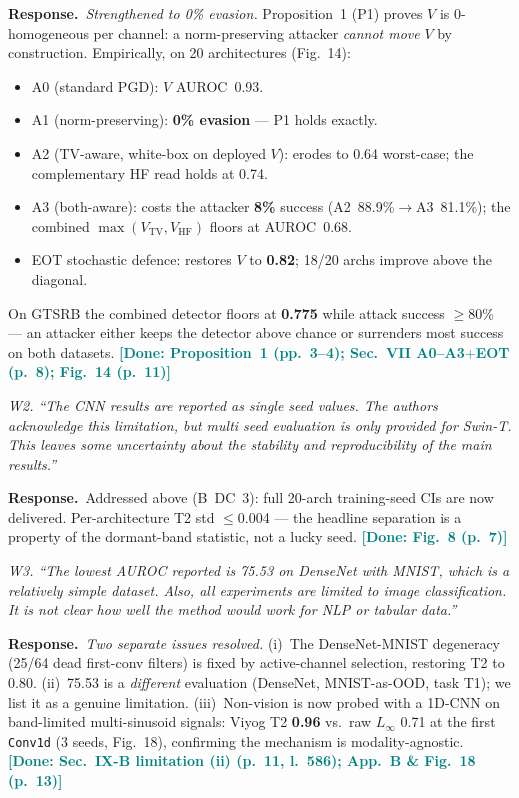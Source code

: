 \documentclass[10pt,letterpaper,journal]{IEEEtran}
\newcommand{\rc}[1]{\smallskip\noindent\textit{\textcolor{black!75}{#1}}\par\smallskip}
\newcommand{\rr}{\noindent\textbf{Response.}~}
\newcommand{\Linf}{$L_\infty$}
\newcommand{\done}[1]{\textcolor{teal}{\textbf{[Done: #1]}}}
\begin{document}
\rr \emph{Strengthened to 0\% evasion.} Proposition~1 (P1) proves $V$ is
$0$-homogeneous per channel: a norm-preserving attacker \emph{cannot move} $V$ by
construction. Empirically, on 20 architectures (Fig.~14):
\begin{itemize}[leftmargin=1.2em,nosep]
\item A0 (standard PGD): $V$ AUROC~0.93.
\item A1 (norm-preserving): \textbf{0\% evasion} --- P1 holds exactly.
\item A2 (TV-aware, white-box on deployed $V$): erodes to 0.64 worst-case;
      the complementary HF read holds at 0.74.
\item A3 (both-aware): costs the attacker \textbf{8\%} success (A2~88.9\%$\to$A3~81.1\%);
      the combined $\max(V_{\mathrm{TV}},V_{\mathrm{HF}})$ floors at AUROC~0.68.
\item EOT stochastic defence: restores $V$ to \textbf{0.82}; 18/20 archs
      improve above the diagonal.
\end{itemize}
On GTSRB the combined detector floors at \textbf{0.775} while attack success
$\ge$80\% --- an attacker either keeps the detector above chance or surrenders
most success on both datasets.
\done{Proposition~1 (pp.~3--4); Sec.~VII A0--A3$+$EOT (p.~8); Fig.~14 (p.~11)}

\rc{W2. ``The CNN results are reported as single seed values. The authors
acknowledge this limitation, but multi seed evaluation is only provided for Swin-T.
This leaves some uncertainty about the stability and reproducibility of the main
results.''}

\rr Addressed above (B~DC~3): full 20-arch training-seed CIs are now delivered.
Per-architecture T2 std $\le$0.004 --- the headline separation is a property of
the dormant-band statistic, not a lucky seed.
\done{Fig.~8 (p.~7)}

\rc{W3. ``The lowest AUROC reported is 75.53 on DenseNet with MNIST, which is a
relatively simple dataset. Also, all experiments are limited to image classification.
It is not clear how well the method would work for NLP or tabular data.''}

\rr \emph{Two separate issues resolved.}
(i)~The DenseNet-MNIST degeneracy (25/64 dead first-conv filters) is fixed by
active-channel selection, restoring T2 to 0.80.
(ii)~75.53 is a \emph{different} evaluation (DenseNet, MNIST-as-OOD, task T1);
we list it as a genuine limitation.
(iii)~Non-vision is now probed with a 1D-CNN on band-limited multi-sinusoid
signals: Viyog T2 \textbf{0.96} vs.\ raw \Linf{} 0.71 at the first
\texttt{Conv1d} (3 seeds, Fig.~18), confirming the mechanism is modality-agnostic.
\done{Sec.~IX-B limitation (ii) (p.~11, l.~586); App.~B \& Fig.~18 (p.~13)}
\end{document}
